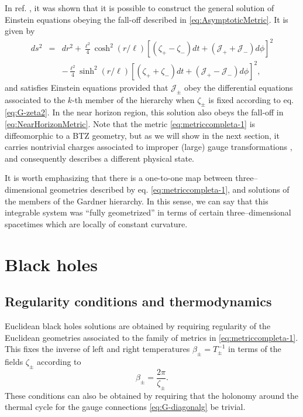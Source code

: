 \documentclass[letterpaper,11pt,oneside]{book}
\begin{document}
In ref. \cite{Afshar:2016wfy,Afshar:2016kjj}, it was shown that it
is possible to construct the general solution of Einstein equations
obeying the fall-off described in \eqref{eq:AsymptoticMetric}. It
is given by
\begin{equation}
	\begin{array}{ccc}
		ds^{2} & = & dr^{2}+\frac{\ell^{2}}{4}\cosh^{2}\left(r/\ell\right)\left[\left(\zeta_{+}-\zeta_{-}\right)dt+\left(\mathcal{J}_{+}+\mathcal{J}_{-}\right)d\phi\right]^{2}\\
		&  & -\frac{\ell^{2}}{4}\sinh^{2}\left(r/\ell\right)\left[\left(\zeta_{+}+\zeta_{-}\right)dt+\left(\mathcal{J}_{+}-\mathcal{J}_{-}\right)d\phi\right]^{2},
	\end{array}\label{eq:metriccompleta-1}
\end{equation}
and satisfies Einstein equations provided that $\mathcal{J}_{\pm}$
obey the differential equations associated to the $k$-th member of
the hierarchy when $\zeta_{\pm}$ is fixed according to eq. \eqref{eq:G-zeta2}.
In the near horizon region, this solution also obeys the fall-off
in \eqref{eq:NearHorizonMetric}. Note that the metric \eqref{eq:metriccompleta-1}
is diffeomorphic to a BTZ geometry, but as we will show in the next
section, it carries nontrivial charges associated to improper (large)
gauge transformations \cite{Benguria:1977in}, and consequently describes
a different physical state.

It is worth emphasizing that there is a one-to-one map between three--dimensional
geometries described by eq. \eqref{eq:metriccompleta-1}, and solutions
of the members of the Gardner hierarchy. In this sense, we can say
that this integrable system was ``fully geometrized'' in terms of
certain three--dimensional spacetimes which are locally of constant
curvature.

\section{Black holes\label{sec:blackholes}}

\subsection{Regularity conditions and thermodynamics}

Euclidean black holes solutions are obtained by requiring regularity
of the Euclidean geometries associated to the family of metrics in
\eqref{eq:metriccompleta-1}. This fixes the inverse of left and right
temperatures $\beta_{\pm}=T_{\pm}^{-1}$ in terms of the fields $\zeta_{\pm}$
according to
\begin{equation}
	\beta_{\pm}=\frac{2\pi}{\zeta_{\pm}}.\label{eq:betamasmenos}
\end{equation}
These conditions can also be obtained by requiring that the holonomy
around the thermal cycle for the gauge connections \eqref{eq:G-diagonalg}
be trivial.
\end{document}
